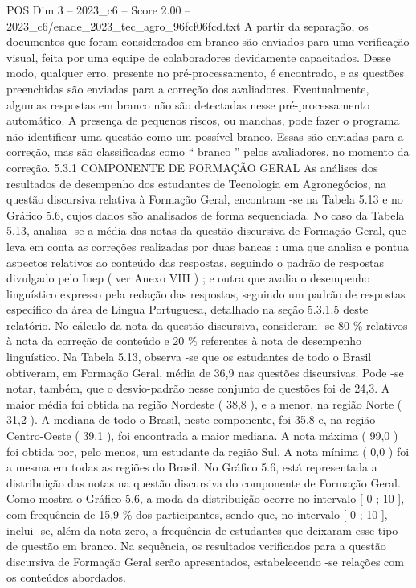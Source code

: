 \begin{textsample}{POS Dim 3 – 2023\_c6 – Score 2.00 – 2023\_c6/enade\_2023\_tec\_agro\_96fcf06fcd.txt}
A partir da separação, os documentos que foram considerados em branco são enviados para uma verificação visual, feita por uma equipe de colaboradores devidamente capacitados.
Desse modo, qualquer erro, presente no pré-processamento, é encontrado, e as questões preenchidas são enviadas para a correção dos avaliadores.
Eventualmente, algumas respostas em branco não são detectadas nesse pré-processamento automático.
A presença de pequenos riscos, ou manchas, pode fazer o programa não identificar uma questão como um possível branco.
Essas são enviadas para a correção, mas são classificadas como “ branco ” pelos avaliadores, no momento da correção. 5.3.1 COMPONENTE DE FORMAÇÃO GERAL As análises dos resultados de desempenho dos estudantes de Tecnologia em Agronegócios, na questão discursiva relativa à Formação Geral, encontram -se na Tabela 5.13 e no Gráfico 5.6, cujos dados são analisados de forma sequenciada.
No caso da Tabela 5.13, analisa -se a média das notas da questão discursiva de Formação Geral, que leva em conta as correções realizadas por duas bancas : uma que analisa e pontua aspectos relativos ao conteúdo das respostas, seguindo o padrão de respostas divulgado pelo Inep ( ver Anexo VIII ) ; e outra que avalia o desempenho linguístico expresso pela redação das respostas, seguindo um padrão de respostas específico da área de Língua Portuguesa, detalhado na seção 5.3.1.5 deste relatório.
No cálculo da nota da questão discursiva, consideram -se 80 \% relativos à nota da correção de conteúdo e 20 \% referentes à nota de desempenho linguístico.
Na Tabela 5.13, observa -se que os estudantes de todo o Brasil obtiveram, em Formação Geral, média de 36,9 nas questões discursivas.
Pode -se notar, também, que o desvio-padrão nesse conjunto de questões foi de 24,3.
A maior média foi obtida na região Nordeste ( 38,8 ), e a menor, na região Norte ( 31,2 ).
A mediana de todo o Brasil, neste componente, foi 35,8 e, na região Centro-Oeste ( 39,1 ), foi encontrada a maior mediana.
A nota máxima ( 99,0 ) foi obtida por, pelo menos, um estudante da região Sul.
A nota mínima ( 0,0 ) foi a mesma em todas as regiões do Brasil.
No Gráfico 5.6, está representada a distribuição das notas na questão discursiva do componente de Formação Geral.
Como mostra o Gráfico 5.6, a moda da distribuição ocorre no intervalo [ 0 ; 10 ], com frequência de 15,9 \% dos participantes, sendo que, no intervalo [ 0 ; 10 ], inclui -se, além da nota zero, a frequência de estudantes que deixaram esse tipo de questão em branco.
Na sequência, os resultados verificados para a questão discursiva de Formação Geral serão apresentados, estabelecendo -se relações com os conteúdos abordados.

\end{textsample}
